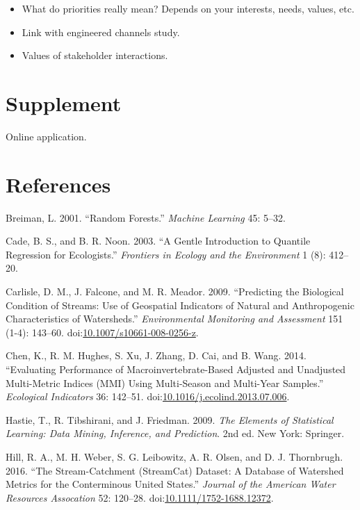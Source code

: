 \documentclass[]{article}
\begin{document}
\begin{itemize}
\item
  What do priorities really mean? Depends on your interests, needs,
  values, etc.
\item
  Link with engineered channels study.
\item
  Values of stakeholder interactions.
\end{itemize}

\section{Supplement}\label{supplement}

Online application.

\section*{References}\label{references}

\hypertarget{refs}{}
\hypertarget{ref-Breiman01}{}
Breiman, L. 2001. ``Random Forests.'' \emph{Machine Learning} 45: 5--32.

\hypertarget{ref-Cade03}{}
Cade, B. S., and B. R. Noon. 2003. ``A Gentle Introduction to Quantile
Regression for Ecologists.'' \emph{Frontiers in Ecology and the
Environment} 1 (8): 412--20.

\hypertarget{ref-Carlisle09}{}
Carlisle, D. M., J. Falcone, and M. R. Meador. 2009. ``Predicting the
Biological Condition of Streams: Use of Geospatial Indicators of Natural
and Anthropogenic Characteristics of Watersheds.'' \emph{Environmental
Monitoring and Assessment} 151 (1-4): 143--60.
doi:\href{https://doi.org/10.1007/s10661-008-0256-z}{10.1007/s10661-008-0256-z}.

\hypertarget{ref-Chen14}{}
Chen, K., R. M. Hughes, S. Xu, J. Zhang, D. Cai, and B. Wang. 2014.
``Evaluating Performance of Macroinvertebrate-Based Adjusted and
Unadjusted Multi-Metric Indices (MMI) Using Multi-Season and Multi-Year
Samples.'' \emph{Ecological Indicators} 36: 142--51.
doi:\href{https://doi.org/10.1016/j.ecolind.2013.07.006}{10.1016/j.ecolind.2013.07.006}.

\hypertarget{ref-Hastie09}{}
Hastie, T., R. Tibshirani, and J. Friedman. 2009. \emph{The Elements of
Statistical Learning: Data Mining, Inference, and Prediction}. 2nd ed.
New York: Springer.

\hypertarget{ref-Hill16}{}
Hill, R. A., M. H. Weber, S. G. Leibowitz, A. R. Olsen, and D. J.
Thornbrugh. 2016. ``The Stream-Catchment (StreamCat) Dataset: A Database
of Watershed Metrics for the Conterminous United States.'' \emph{Journal
of the American Water Resources Assocation} 52: 120--28.
doi:\href{https://doi.org/10.1111/1752-1688.12372}{10.1111/1752-1688.12372}.
\end{document}
